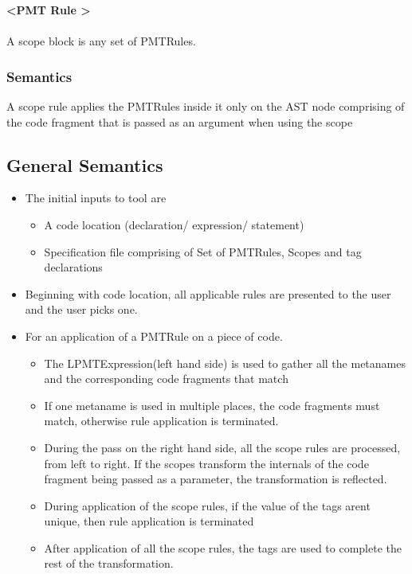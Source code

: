 \documentclass[preprint]{sigplanconf}
\begin{document}
\textbf{{{ \textless PMT Rule \textgreater* }}}
\\ 
\\
A scope block is any set of PMTRules.
\subsubsection{Semantics}

A scope rule applies the PMTRules inside it only on the AST node comprising of the code fragment that is passed as an argument when using the scope

\subsection{General Semantics}
\begin{itemize}
\item The initial inputs to tool are 
\begin{itemize}
\item A code location (declaration/ expression/ statement)
\item Specification file comprising of Set of PMTRules, Scopes and tag declarations
\end{itemize}
\item Beginning with code location, all applicable rules are presented to the user and the user picks one.
\item For an application of a PMTRule on a piece of code.
\begin{itemize}
\item The LPMTExpression(left hand side) is used to gather all the metanames and the corresponding code fragments that match
\item If one metaname is used in multiple places, the code fragments must match, otherwise rule application is terminated.
\item During the pass on the right hand side, all the scope rules are processed, from left to right. If the scopes transform the internals of the code fragment being passed as a parameter, the transformation is reflected.
\item During application of the scope rules, if the value of the tags arent unique, then rule application is terminated
\item After application of all the scope rules, the tags are used to complete the rest of the transformation.
\end{itemize}
\end{itemize}

\appendix
\end{document}

